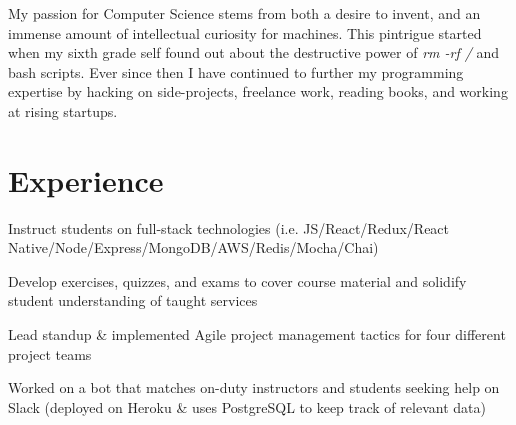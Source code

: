 \documentclass[letterpaper]{deedy-resume} %
\begin{document}
\hfill
%
%
\begin{minipage}[t]{0.66\textwidth} %


  My passion for Computer Science stems from both a desire to invent,
  and an immense amount of intellectual curiosity for machines. This
  pintrigue started when my sixth grade self found
  out about the destructive power of {\it rm -rf /} and bash scripts.
  Ever since then I have continued to further my programming
  expertise by hacking on side-projects, freelance work,
  reading books, and working at rising startups.
  


  \section{Experience}



  \begin{tightitemize}
  \item Instruct students on full-stack technologies (i.e. JS/React/Redux/React Native/Node/Express/MongoDB/AWS/Redis/Mocha/Chai)
  \item Develop exercises, quizzes, and exams to cover course material and solidify student understanding of taught services
  \item Lead standup \& implemented Agile project management tactics for four different project teams
  \item Worked on a bot that matches on-duty instructors and students seeking help on Slack (deployed on Heroku \& uses PostgreSQL to keep track of relevant data)
  \end{tightitemize}


\end{minipage}
\end{document}
